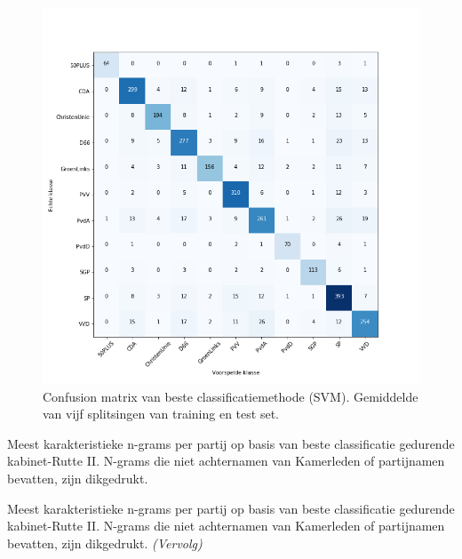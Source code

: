 \begin{figure}[H]
  \centering
    \includegraphics[width=0.50\paperwidth]{Verslag/Tables/confusionmatrix.png}
\caption{Confusion matrix van beste classificatiemethode (SVM). Gemiddelde van vijf splitsingen van training en test set.}
\label{fig:confusionmatrix}
\end{figure}



\begin{table}[H]
\caption{Meest karakteristieke n-grams per partij op basis van beste classificatie gedurende kabinet-Rutte II. N-grams die niet achternamen van Kamerleden of partijnamen bevatten, zijn dikgedrukt. }
\label{tab:MostImportantWords} 
\centering
\hspace*{-1in}
 
\end{table} 
\addtocounter{table}{-1} 
\begin{table}[H]
\caption{Meest karakteristieke n-grams per partij op basis van beste classificatie gedurende kabinet-Rutte II. N-grams die niet achternamen van Kamerleden of partijnamen bevatten, zijn dikgedrukt.  \emph{(Vervolg)}} 
\centering
\hspace*{-1.3in}
 
\end{table}

